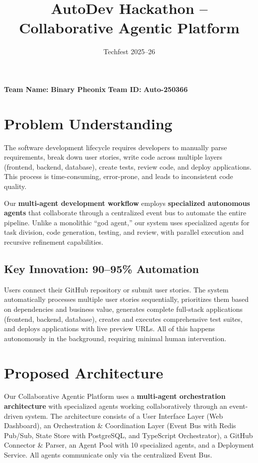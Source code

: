\documentclass[11pt,a4paper]{article}
\title{\textbf{AutoDev Hackathon -- Collaborative Agentic Platform}}
\author{Techfest 2025--26}
\date{}
\begin{document}
\maketitle
\vspace*{-0.3cm}

\noindent\textbf{Team Name:} \textbf{Binary Pheonix} \quad \textbf{Team ID:} \textbf{Auto-250366} \\

\vspace*{-0.2cm}

\section{Problem Understanding}

The software development lifecycle requires developers to manually parse requirements, break down user stories, write code across multiple layers (frontend, backend, database), create tests, review code, and deploy applications. This process is time-consuming, error-prone, and leads to inconsistent code quality.

Our \textbf{multi-agent development workflow} employs \textbf{specialized autonomous agents} that collaborate through a centralized event bus to automate the entire pipeline. Unlike a monolithic ``god agent,'' our system uses specialized agents for task division, code generation, testing, and review, with parallel execution and recursive refinement capabilities.

\subsection*{Key Innovation: 90--95\% Automation}

Users connect their GitHub repository or submit user stories. The system automatically processes multiple user stories sequentially, prioritizes them based on dependencies and business value, generates complete full-stack applications (frontend, backend, database), creates and executes comprehensive test suites, and deploys applications with live preview URLs. All of this happens autonomously in the background, requiring minimal human intervention.

\section{Proposed Architecture}

Our Collaborative Agentic Platform uses a \textbf{multi-agent orchestration architecture} with specialized agents working collaboratively through an event-driven system. The architecture consists of a User Interface Layer (Web Dashboard), an Orchestration \& Coordination Layer (Event Bus with Redis Pub/Sub, State Store with PostgreSQL, and TypeScript Orchestrator), a GitHub Connector \& Parser, an Agent Pool with 10 specialized agents, and a Deployment Service. All agents communicate only via the centralized Event Bus.
\end{document}
